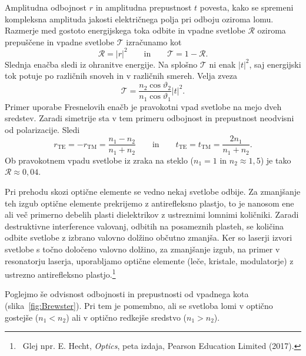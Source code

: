 Amplitudna odbojnost $r$ in amplitudna prepustnost $t$ povesta, kako se spremeni 
kompleksna amplituda jakosti električnega polja pri odboju oziroma lomu.
Razmerje med gostoto energijskega toka odbite in vpadne svetlobe $\mathcal{R}$ oziroma 
prepuščene in vpadne svetlobe $\mathcal{T}$ izračunamo kot 
\begin{equation}
\mathcal{R}=\left|r\right|^{2} \qquad \mathrm{in} \qquad \mathcal{T}=1-\mathcal{R}.
\end{equation}
Slednja enačba sledi iz ohranitve energije. Na splošno $\mathcal{T}$
ni enak $\left|t\right|^{2}$, saj energijski tok potuje po različnih
snoveh in v različnih smereh. Velja zveza
\begin{equation}
\mathcal{T}=\frac{n_{2}\cos\vartheta_{2}}{n_{1}\cos\vartheta_{1}}\left|t\right|^{2}\!.
\end{equation}
Primer uporabe Fresnelovih enačb je pravokotni vpad svetlobe na mejo dveh sredstev. 
Zaradi simetrije sta v tem primeru odbojnost in prepustnost neodvisni od polarizacije. Sledi
\begin{equation}
r_{\mathrm{TE}} = -r_{\mathrm{TM}} = \frac{n_1-n_2}{n_1+n_2}
\qquad \mathrm{in} \qquad 
t_{\mathrm{TE}} = t_{\mathrm{TM}} = \frac{2n_1}{n_1+n_2}. 
\end{equation}
Ob pravokotnem vpadu svetlobe iz zraka na steklo ($n_1 = 1$ in $n_2 \approx 1,5$) je tako
$\mathcal{R} \approx 0,04$.

\begin{remark}
Pri prehodu skozi optične elemente se vedno nekaj
svetlobe odbije. Za zmanjšanje teh izgub optične elemente
prekrijemo z antirefleksno plastjo, to je nanosom ene ali več primerno
debelih plasti dielektrikov z ustreznimi lomnimi količniki.
Zaradi destruktivne interference valovanj, odbitih na posameznih plasteh,
se količina odbite svetlobe z izbrano valovno dolžino občutno zmanjša. Ker so laserji
izvori svetlobe s točno določeno valovno dolžino, za zmanjšanje
izgub, na primer v resonatorju laserja, uporabljamo optične
elemente (leče, kristale, modulatorje) z ustrezno antirefleksno plastjo.\footnote{~Glej npr. 
E. Hecht, {\it Optics}, peta izdaja, Pearson Education Limited (2017).}
\end{remark}

Poglejmo še odvisnost odbojnosti in prepustnosti od vpadnega kota (slika~\ref{fig:Brewster}). 
Pri tem je pomembno, ali se svetloba lomi v optično gostejše ($n_1<n_2$) ali v optično
redkejše sredstvo ($n_1>n_2$). 

